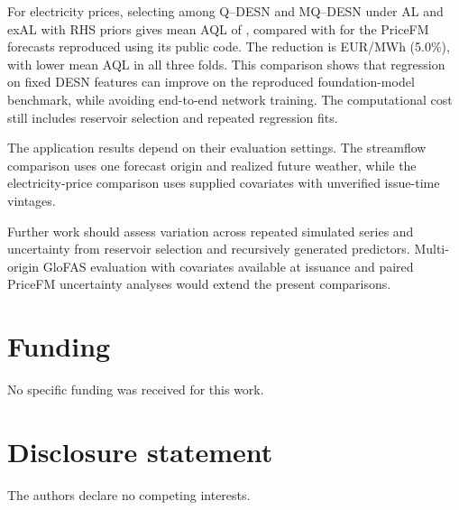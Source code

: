 \documentclass[12pt,letterpaper]{article}
\newif\ifQdesnAnonymous
\numberwithin{equation}{section}
\begin{document}
For electricity prices, selecting among Q--DESN and MQ--DESN under AL and
exAL with RHS priors gives mean AQL of \PricefmFullMeanSelectedAql{}, compared
with \PricefmFullMeanPricefmAql{} for the PriceFM forecasts reproduced using
its public code. The reduction is \PricefmFullMeanReductionAql{} EUR/MWh
(5.0\%), with lower mean AQL in all three folds. This comparison shows that
regression on fixed DESN features can improve on the reproduced
foundation-model benchmark, while avoiding end-to-end network training.
The computational cost still includes reservoir selection and repeated
regression fits.

The application results depend on their evaluation settings. The streamflow
comparison uses one forecast origin and realized future weather, while the
electricity-price comparison uses supplied covariates with unverified
issue-time vintages.

Further work should assess variation across repeated simulated series and
uncertainty from reservoir selection and recursively generated predictors.
Multi-origin GloFAS evaluation with covariates available at issuance and
paired PriceFM uncertainty analyses would extend the present comparisons.

\ifQdesnAnonymous
\else
\section*{Funding}
No specific funding was received for this work.

\section*{Disclosure statement}
The authors declare no competing interests.
\fi



\end{document}
